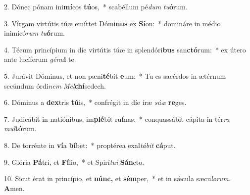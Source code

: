 \item 2. Dónec pónam ini\textbf{mí}cos \textbf{tú}os,~* scabéllum pé\textit{dum} \textit{tu}\textbf{ó}rum.

\item 3. Vírgam virtútis túæ emíttet Dómi\textbf{nus} ex \textbf{Sí}on:~* domináre in médio inimicó\textit{rum} \textit{tu}\textbf{ó}rum.

\item 4. Técum princípium in díe virtútis túæ in splendóri\textbf{bus} san\textbf{ctó}rum:~* ex útero ante lucíferum \textit{génu}\textbf{i} te.

\item 5. Jurávit Dóminus, et non pæni\textbf{té}bit \textbf{e}um:~* Tu es sacérdos in ætérnum secúndum órdi\textit{nem} \textit{Mel}\textbf{chí}sedech.

\item 6. Dóminus a \textbf{dex}tris \textbf{tú}is,~* confrégit in díe íræ \textit{súæ} \textbf{re}ges.

\item 7. Judicábit in natiónibus, im\textbf{plé}bit ru\textbf{í}nas:~* conquassábit cápita in tér\textit{ra} \textit{mul}\textbf{tó}rum.

\item 8. De torrénte in \textbf{ví}a \textbf{bí}bet:~* proptérea exal\textit{tábit} \textbf{cá}put.

\item 9. Glória \textbf{Pá}tri, et \textbf{Fí}lio,~* et Spirí\textit{tui} \textbf{Sán}cto.

\item 10. Sicut érat in princípio, et \textbf{núnc,} et \textbf{sém}per,~* et in sǽcula sæcu\textit{lorum.} \textbf{A}men.
